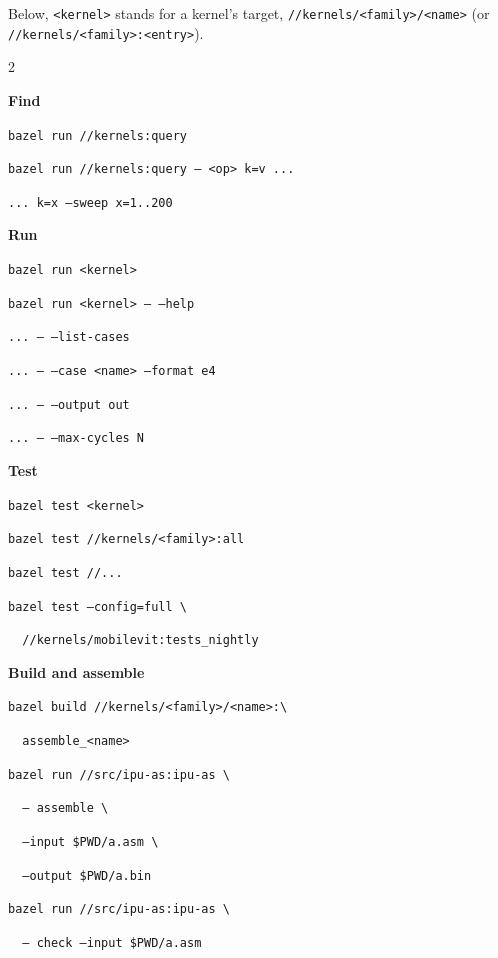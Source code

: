 \documentclass[11pt,a4paper]{article}
\begin{document}
\begin{tcolorbox}[enhanced, colback=white, colframe=muted, boxrule=0.8pt, arc=4pt,
  left=10pt, right=10pt, top=8pt, bottom=6pt]
{\small
Below, \texttt{<kernel>} stands for a kernel's target,
\texttt{//kernels/<family>/<name>} (or \texttt{//kernels/<family>:<entry>}).

\begin{multicols}{2}
\raggedright
\textbf{\sffamily Find}\par
\texttt{bazel run //kernels:query}\par
\texttt{bazel run //kernels:query -- <op> k=v ...}\par
\texttt{... k=x --sweep x=1..200}\par

\medskip\textbf{\sffamily Run}\par
\texttt{bazel run <kernel>}\par
\texttt{bazel run <kernel> -- --help}\par
\texttt{... -- --list-cases}\par
\texttt{... -- --case <name> --format e4}\par
\texttt{... -- --output out}\par
\texttt{... -- --max-cycles N}\par

\medskip\textbf{\sffamily Test}\par
\texttt{bazel test <kernel>}\par
\texttt{bazel test //kernels/<family>:all}\par
\texttt{bazel test //...}\par
\texttt{bazel test --config=full \textbackslash}\par
\texttt{\ \ //kernels/mobilevit:tests\_nightly}\par

\medskip\textbf{\sffamily Build and assemble}\par
\texttt{bazel build //kernels/<family>/<name>:\textbackslash}\par
\texttt{\ \ assemble\_<name>}\par
\texttt{bazel run //src/ipu-as:ipu-as \textbackslash}\par
\texttt{\ \ -- assemble \textbackslash}\par
\texttt{\ \ --input \$PWD/a.asm \textbackslash}\par
\texttt{\ \ --output \$PWD/a.bin}\par
\texttt{bazel run //src/ipu-as:ipu-as \textbackslash}\par
\texttt{\ \ -- check --input \$PWD/a.asm}\par


\end{multicols}}
\end{tcolorbox}
\end{document}
